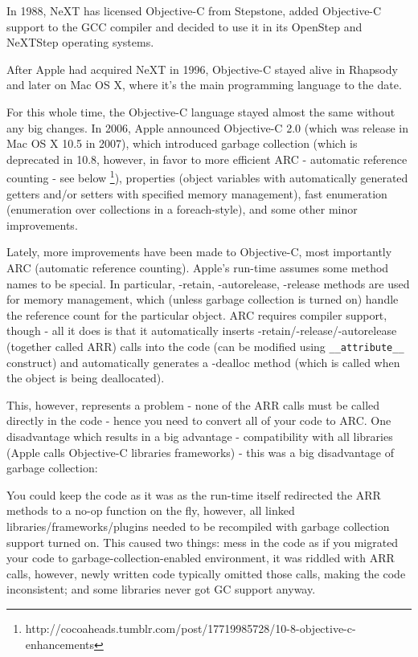 \documentclass[a4paper, 11pt, fleqn]{book}
\begin{document}
In 1988, NeXT has licensed Objective-C from Stepstone, added Objective-C support to the GCC compiler and decided to use it in its OpenStep and NeXTStep operating systems.

After Apple had acquired NeXT in 1996, Objective-C stayed alive in Rhapsody and later on Mac OS X, where it's the main programming language to the date.

For this whole time, the Objective-C language stayed almost the same without any big changes. In 2006, Apple announced Objective-C 2.0 (which was release in Mac OS X 10.5 in 2007), which introduced garbage collection (which is deprecated in 10.8, however, in favor to more efficient ARC - automatic reference counting - see below \footnote{http://cocoaheads.tumblr.com/post/17719985728/10-8-objective-c-enhancements}), properties (object variables with automatically generated getters and/or setters with specified memory management), fast enumeration (enumeration over collections in a foreach-style), and some other minor improvements.

Lately, more improvements have been made to Objective-C, most importantly ARC (automatic reference counting). Apple's run-time assumes some method names to be special. In particular, -retain, -autorelease, -release methods are used for memory management, which (unless garbage collection is turned on) handle the reference count for the particular object. ARC requires compiler support, though - all it does is that it automatically inserts -retain/-release/-autorelease (together called ARR) calls into the code (can be modified using \verb=__attribute__= construct) and automatically generates a -dealloc method (which is called when the object is being deallocated).

This, however, represents a problem - none of the ARR calls must be called directly in the code - hence you need to convert all of your code to ARC. One disadvantage which results in a big advantage - compatibility with all libraries (Apple calls Objective-C libraries frameworks) - this was a big disadvantage of garbage collection: 

You could keep the code as it was as the run-time itself redirected the ARR methods to a no-op function on the fly, however, all linked libraries/frameworks/plugins needed to be recompiled with garbage collection support turned on. This caused two things: mess in the code as if you migrated your code to garbage-collection-enabled environment, it was riddled with ARR calls, however, newly written code typically omitted those calls, making the code inconsistent; and some libraries never got GC support anyway.
\end{document}
